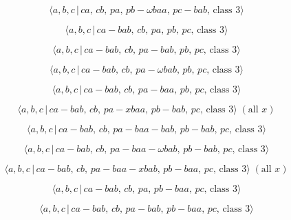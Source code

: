 \documentclass[10pt]{article}
\begin{document}
\begin{equation}
\langle a,b,c\,|\,ca,\,cb,\,pa,\,pb-\omega baa,\,pc-bab,\,\text{class }%
3\rangle  \tag{6.130}
\end{equation}

\begin{equation}
\langle a,b,c\,|\,ca-bab,\,cb,\,pa,\,pb,\,pc,\,\text{class }3\rangle 
\tag{6.131}
\end{equation}

\begin{equation}
\langle a,b,c\,|\,ca-bab,\,cb,\,pa-bab,\,pb,\,pc,\,\text{class }3\rangle 
\tag{6.132}
\end{equation}

\begin{equation}
\langle a,b,c\,|\,ca-bab,\,cb,\,pa-\omega bab,\,pb,\,pc,\,\text{class }%
3\rangle  \tag{6.133}
\end{equation}

\begin{equation}
\langle a,b,c\,|\,ca-bab,\,cb,\,pa-baa,\,pb,\,pc,\,\text{class }3\rangle 
\tag{6.134}
\end{equation}

\begin{equation}
\langle a,b,c\,|\,ca-bab,\,cb,\,pa-xbaa,\,pb-bab,\,pc,\,\text{class }%
3\rangle \;(\text{all }x)  \tag{6.135}
\end{equation}

\begin{equation}
\langle a,b,c\,|\,ca-bab,\,cb,\,pa-baa-bab,\,pb-bab,\,pc,\,\text{class }%
3\rangle  \tag{6.136}
\end{equation}

\begin{equation}
\langle a,b,c\,|\,ca-bab,\,cb,\,pa-baa-\omega bab,\,pb-bab,\,pc,\,\text{
class }3\rangle  \tag{6.137}
\end{equation}

\begin{equation}
\langle a,b,c\,|\,ca-bab,\,cb,\,pa-baa-xbab,\,pb-baa,\,pc,\,\text{class }%
3\rangle\;(\text{all }x)  \tag{6.138}
\end{equation}

\begin{equation}
\langle a,b,c\,|\,ca-bab,\,cb,\,pa,\,pb-baa,\,pc,\,\text{class }3\rangle 
\tag{6.139}
\end{equation}

\begin{equation}
\langle a,b,c\,|\,ca-bab,\,cb,\,pa-bab,\,pb-baa,\,pc,\,\text{class }3\rangle
\tag{6.140}
\end{equation}
\end{document}
